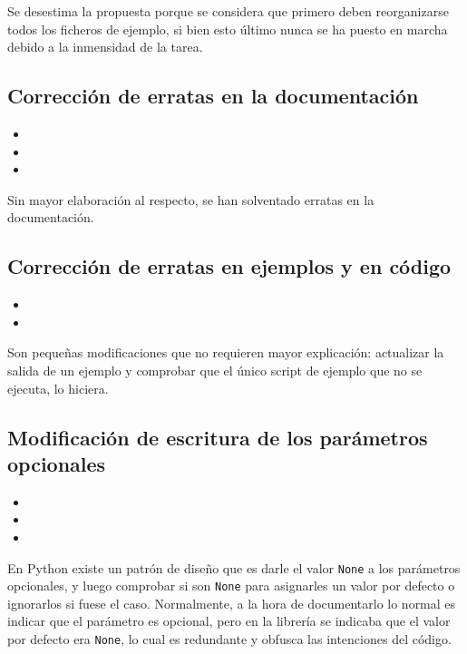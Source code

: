 Se desestima la propuesta porque se considera que primero deben reorganizarse todos los ficheros de ejemplo, si bien esto último nunca se ha puesto en marcha debido a la inmensidad de la tarea.

\subsection{Corrección de erratas en la documentación}

\begin{itemize}
    \item {}
    \item {}
    \item {}
\end{itemize}

Sin mayor elaboración al respecto, se han solventado erratas en la documentación.

\subsection{Corrección de erratas en ejemplos y en código}

\begin{itemize}
    \item {}
    \item {}
\end{itemize}

Son pequeñas modificaciones que no requieren mayor explicación: actualizar la salida de un ejemplo y comprobar que el único script de ejemplo que no se ejecuta, lo hiciera.

\subsection{Modificación de escritura de los parámetros opcionales}

\begin{itemize}
    \item {}
    \item {}
    \item {}
\end{itemize}

En Python existe un patrón de diseño que es darle el valor \texttt{None} a los parámetros opcionales, y luego comprobar si son \texttt{None} para asignarles un valor por defecto o ignorarlos si fuese el caso. Normalmente, a la hora de documentarlo lo normal es indicar que el parámetro es opcional, pero en la librería se indicaba que el valor por defecto era \texttt{None}, lo cual es redundante y obfusca las intenciones del código.

